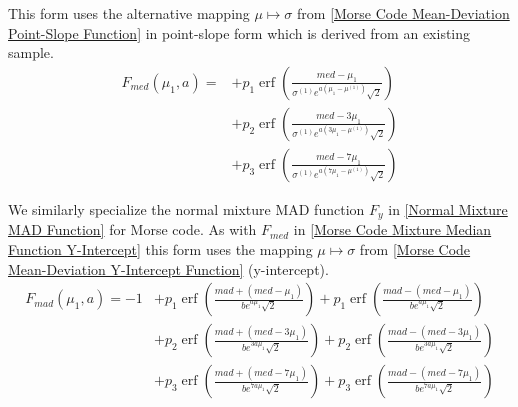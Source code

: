 \documentclass{article}
\newcommand{\mli}[1]{\mathit{#1}}
\DeclareMathOperator\erf{erf}
\begin{document}
This form uses the alternative mapping $\mu \mapsto \sigma$ from \ref{Morse Code Mean-Deviation Point-Slope Function} in point-slope form which is derived from an existing sample. 
%
\begin{equation}\label{Morse Code Mixture Median Function Point-Slope}
\begin{split}
F_{\mli{med}}(\mu_1, a) =
&   + p_1 \erf \left( \frac{\mli{med} - \mu_1}
        {\sigma^{(1)} e^{a (\mu_1 - \mu^{(1)})} \sqrt{2}}
        \right) \\
&   + p_2 \erf \left( \frac{\mli{med} - 3\mu_1}
        {\sigma^{(1)} e^{a (3\mu_1 - \mu^{(1)})} \sqrt{2}}
        \right) \\
&   + p_3 \erf \left( \frac{\mli{med} - 7\mu_1}
        {\sigma^{(1)} e^{a (7\mu_1 - \mu^{(1)})} \sqrt{2}}
        \right)
\end{split}
\end{equation}

We similarly specialize the normal mixture MAD function $F_y$ in \ref{Normal Mixture MAD Function} for Morse code. As with $F_{\mli{med}}$ in \ref{Morse Code Mixture Median Function Y-Intercept} this form uses the mapping $\mu \mapsto \sigma$ from \ref{Morse Code Mean-Deviation Y-Intercept Function} (y-intercept).
%
\begin{equation}\label{Morse Code Mixture MAD Function Y-Intercept}
\begin{split}
F_{\mli{mad}}(\mu_1, a) = -1
&   + p_1 \erf \left( \frac{\mli{mad} + (\mli{med} - \mu_1)}
        {b e^{a\mu_1} \sqrt{2}}
        \right)
    + p_1 \erf \left( \frac{\mli{mad} - (\mli{med} - \mu_1)}
        {b e^{a\mu_1} \sqrt{2}}
        \right) \\
&   + p_2 \erf \left( \frac{\mli{mad} + (\mli{med} - 3\mu_1)}
        {b e^{3a\mu_1} \sqrt{2}}
        \right)
    + p_2 \erf \left( \frac{\mli{mad} - (\mli{med} - 3\mu_1)}
        {b e^{3a\mu_1} \sqrt{2}}
        \right) \\
&   + p_3 \erf \left( \frac{\mli{mad} + (\mli{med} - 7\mu_1)}
        {b e^{7a\mu_1} \sqrt{2}}
        \right)
    + p_3 \erf \left( \frac{\mli{mad} - (\mli{med} - 7\mu_1)}
        {b e^{7a\mu_1} \sqrt{2}}
        \right)
\end{split}
\end{equation}
\end{document}
